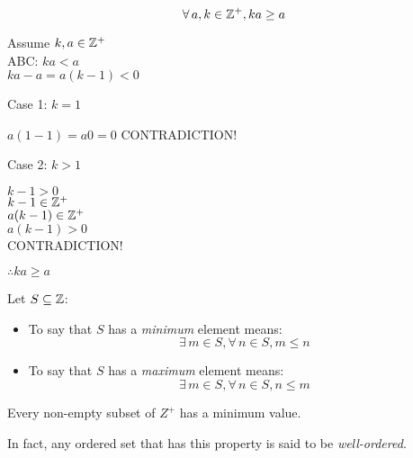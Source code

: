 \documentclass[letterpaper,12pt,fleqn]{article}
\begin{document}
\begin{theorem}
  \listbreak
  \[\forall\,a,k\in\mathbb{Z}^+,ka\ge a\]
\end{theorem}

\begin{theproof}
  Assume $k,a\in\mathbb{Z}^+$ \\
  ABC: $ka<a$ \\
  $ka-a=a(k-1)<0$
  \begin{description}
  \item{Case 1: $k=1$}

    $a(1-1)=a0=0$
    CONTRADICTION!
\newpage
  \item {Case 2: $k>1$}

    $k-1>0$ \\
    $k-1\in\mathbb{Z}^+$ \\
    $a(k-1)\in\mathbb{Z}^+$ \\
    $a(k-1)>0$ \\
    CONTRADICTION!
  \end{description}
  $\therefore ka\ge a$
\end{theproof}

\begin{definition}
  Let $S\subseteq\mathbb{Z}$:
  \begin{itemize}
  \item To say that $S$ has a \emph{minimum} element means:
    \[\exists\,m\in S,\forall\,n\in S,m\le n\]

  \item To say that $S$ has a \emph{maximum} element means:
    \[\exists\,m\in S,\forall\,n\in S,n\le m\]
  \end{itemize}
\end{definition}

\begin{axiom}
  Every non-empty subset of $Z^+$ has a minimum value.
\end{axiom}

In fact, any ordered set that has this property is said to be
\emph{well-ordered}.
\end{document}
